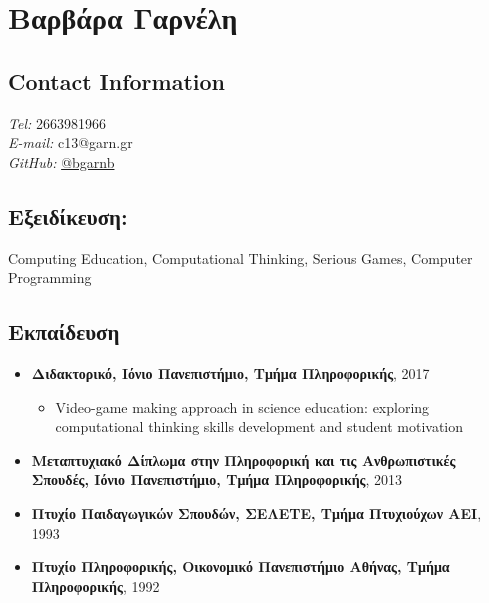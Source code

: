 \documentclass[%
    11pt,
  oneside
  ]{memoir}
\let\oldsection\section
\renewcommand{\section}[1]{%
  \oldsection{#1}
  \leavevmode
  \par
  \vspace{\dimexpr-\baselineskip-\parskip}
}
\begin{document}
      \chapter*{Βαρβάρα Γαρνέλη}
  

  \hypertarget{contact-information}{%
  \section{Contact Information}\label{contact-information}}
    \begin{minipage}[t]{0.3\textwidth}
      
    \end{minipage}
    \begin{minipage}[t]{0.7\textwidth}
                {\textit{Tel:}} 2663981966 \\
                        {\textit{E-mail:}} c13@garn.gr \\
                                        {\textit{GitHub:}} \href{http://github.com/bgarnb}{@bgarnb}
            \end{minipage}
  \hypertarget{ux3b5ux3beux3b5ux3b9ux3b4ux3afux3baux3b5ux3c5ux3c3ux3b7}{%
\section{Εξειδίκευση:}\label{ux3b5ux3beux3b5ux3b9ux3b4ux3afux3baux3b5ux3c5ux3c3ux3b7}}

Computing Education, Computational Thinking, Serious Games, Computer
Programming

\hypertarget{ux3b5ux3baux3c0ux3b1ux3afux3b4ux3b5ux3c5ux3c3ux3b7}{%
\section{Εκπαίδευση}\label{ux3b5ux3baux3c0ux3b1ux3afux3b4ux3b5ux3c5ux3c3ux3b7}}

\begin{itemize}
\tightlist
\item
  \textbf{Διδακτορικό, Ιόνιο Πανεπιστήμιο, Τμήμα Πληροφορικής}, 2017

  \begin{itemize}
  \tightlist
  \item
    Video-game making approach in science education: exploring
    computational thinking skills development and student motivation
  \end{itemize}
\item
  \textbf{Μεταπτυχιακό Δίπλωμα στην Πληροφορική και τις Ανθρωπιστικές
  Σπουδές, Ιόνιο Πανεπιστήμιο, Τμήμα Πληροφορικής}, 2013
\item
  \textbf{Πτυχίο Παιδαγωγικών Σπουδών, ΣΕΛΕΤΕ, Τμήμα Πτυχιούχων ΑΕΙ},
  1993
\item
  \textbf{Πτυχίο Πληροφορικής, Οικονομικό Πανεπιστήμιο Αθήνας, Τμήμα
  Πληροφορικής}, 1992
\end{itemize}
\end{document}
